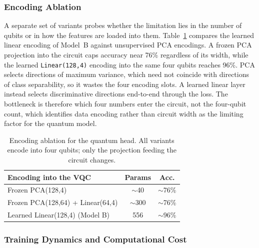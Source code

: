 \subsubsection{Encoding Ablation}

A separate set of variants probes whether the limitation lies in the number of
qubits or in how the features are loaded into them. Table~\ref{tab:exp2_encoding}
compares the learned linear encoding of Model~B against unsupervised PCA encodings.
A frozen PCA projection into the circuit caps accuracy near 76\% regardless of its
width, while the learned \texttt{Linear(128,4)} encoding into the same four qubits
reaches 96\%. PCA selects directions of maximum variance, which need not coincide
with directions of class separability, so it wastes the four encoding slots. A
learned linear layer instead selects discriminative directions end-to-end through
the loss. The bottleneck is therefore which four numbers enter the circuit, not the
four-qubit count, which identifies data encoding rather than circuit width as the
limiting factor for the quantum model.

\begin{table}[t]
    \centering
    \caption{Encoding ablation for the quantum head. All variants encode into four
        qubits; only the projection feeding the circuit changes.}
    \label{tab:exp2_encoding}
    \setlength{\tabcolsep}{4pt}
    \footnotesize
    \begin{tabular}{lcc}
        \toprule
        Encoding into the VQC             & Params    & Acc.       \\
        \midrule
        Frozen PCA(128,4)                 & $\sim$40  & $\sim$76\% \\
        Frozen PCA(128,64) + Linear(64,4) & $\sim$300 & $\sim$76\% \\
        Learned Linear(128,4) (Model B)   & 556       & $\sim$96\% \\
        \bottomrule
    \end{tabular}
\end{table}

\subsubsection{Training Dynamics and Computational Cost}

